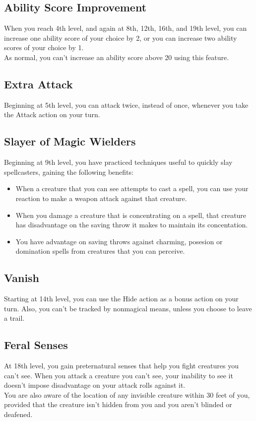\documentclass[11pt,a4paper,twocolumn]{article}
\begin{document}
	\subsection*{Ability Score Improvement}
	When you reach 4th level, and again at 8th, 12th, 16th, and 19th level, you can increase one ability score of your choice by 2, or you can increase two ability scores of your choice by 1. \\
	As normal, you can’t increase an ability score above 20 using this feature.
	
	\subsection*{Extra Attack}
	Beginning at 5th level, you can attack twice, instead of once, whenever you take the Attack action on your turn.
	
	\subsection*{Slayer of Magic Wielders}
	Beginning at 9th level, you have practiced techniques useful to quickly slay spellcasters, gaining the following benefits:
	\begin{itemize}
		\item  When a creature that you can see attempts to cast a spell, you can use your reaction to make a weapon attack against that creature.
		\item When you damage a creature that is concentrating on a spell, that creature has disadvantage on the saving throw it makes to maintain its concentation.
		\item You have advantage on saving throws against charming, posesion or 	domination spells from creatures that you can perceive.
	\end{itemize}
	
	\subsection*{Vanish}
	Starting at 14th level, you can use the Hide action as a bonus action on your turn. Also, you can’t be tracked by nonmagical means, unless you choose to leave a trail.
	
	\subsection*{Feral Senses}
	At 18th level, you gain preternatural senses that help you fight creatures you can’t see. When you attack a creature you can’t see, your inability to see it doesn’t impose disadvantage on your attack rolls against it. \\
	You are also aware of the location of any invisible creature within 30 feet of you, provided that the creature isn’t hidden from you and you aren’t blinded or deafened.
	
\end{document}
